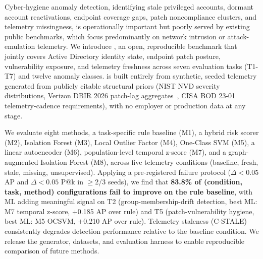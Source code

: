 
Cyber-hygiene anomaly detection, identifying stale privileged accounts, dormant
account reactivations, endpoint coverage gaps, patch noncompliance clusters, and
telemetry missingness, is operationally important but poorly served by existing
public benchmarks, which focus predominantly on network intrusion or
attack-emulation telemetry. We introduce \hygienebench, an open, reproducible
benchmark that jointly covers Active Directory identity state, endpoint patch
posture, vulnerability exposure, and telemetry freshness across seven evaluation
tasks (T1-T7) and twelve anomaly classes. \hygienebench is built entirely from
synthetic, seeded telemetry generated from publicly citable structural priors
(NIST NVD severity distributions, Verizon DBIR 2026 patch-lag
aggregates~\cite{verizon_dbir_2026}, CISA BOD 23-01 telemetry-cadence
requirements), with no employer or production data at any stage.

We evaluate eight methods, a task-specific rule baseline (M1), a hybrid risk
scorer (M2), Isolation Forest (M3), Local Outlier Factor (M4), One-Class SVM
(M5), a linear autoencoder (M6), population-level temporal z-score (M7), and a
graph-augmented Isolation Forest (M8), across five telemetry conditions
(baseline, fresh, stale, missing, unsupervised). Applying a pre-registered failure
protocol ($\Delta<0.05$ AP and $\Delta<0.05$ P@k in $\geq$2/3 seeds), we find that
\textbf{83.8\% of (condition, task, method) configurations fail to improve on the
rule baseline}, with ML adding meaningful signal on T2 (group-membership-drift
detection, best ML: M7 temporal z-score, $+$0.185 AP over rule) and T5
(patch-vulnerability hygiene, best ML: M5 OCSVM, $+$0.210 AP over rule).
Telemetry staleness (C-STALE) consistently degrades detection performance relative
to the baseline condition. We release the generator, datasets, and evaluation
harness to enable reproducible comparison of future methods.
